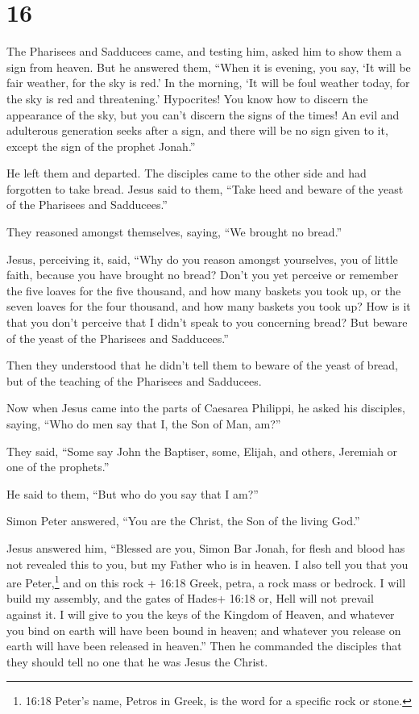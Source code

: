 \hypertarget{section-15}{%
\section{16}\label{section-15}}

 The Pharisees and Sadducees came, and testing him, asked
him to show them a sign from heaven.  But he answered them,
``When it is evening, you say, `It will be fair weather, for the sky is
red.'  In the morning, `It will be foul weather today, for
the sky is red and threatening.' Hypocrites! You know how to discern the
appearance of the sky, but you can't discern the signs of the times!
 An evil and adulterous generation seeks after a sign, and
there will be no sign given to it, except the sign of the prophet
Jonah.''

He left them and departed.  The disciples came to the other
side and had forgotten to take bread.  Jesus said to them,
``Take heed and beware of the yeast of the Pharisees and Sadducees.''

 They reasoned amongst themselves, saying, ``We brought no
bread.''

 Jesus, perceiving it, said, ``Why do you reason amongst
yourselves, you of little faith, because you have brought no bread?
 Don't you yet perceive or remember the five loaves for the
five thousand, and how many baskets you took up,  or the
seven loaves for the four thousand, and how many baskets you took up?
 How is it that you don't perceive that I didn't speak to
you concerning bread? But beware of the yeast of the Pharisees and
Sadducees.''

 Then they understood that he didn't tell them to beware of
the yeast of bread, but of the teaching of the Pharisees and Sadducees.

 Now when Jesus came into the parts of Caesarea Philippi,
he asked his disciples, saying, ``Who do men say that I, the Son of Man,
am?''

 They said, ``Some say John the Baptiser, some, Elijah, and
others, Jeremiah or one of the prophets.''

 He said to them, ``But who do you say that I am?''

 Simon Peter answered, ``You are the Christ, the Son of the
living God.''

 Jesus answered him, ``Blessed are you, Simon Bar Jonah,
for flesh and blood has not revealed this to you, but my Father who is
in heaven.  I also tell you that you are Peter,\footnote{16:18
  Peter's name, Petros in Greek, is the word for a specific rock or
  stone.} and on this rock + 16:18 Greek, petra, a rock mass or bedrock.
I will build my assembly, and the gates of Hades+ 16:18 or, Hell will
not prevail against it.  I will give to you the keys of the
Kingdom of Heaven, and whatever you bind on earth will have been bound
in heaven; and whatever you release on earth will have been released in
heaven.''  Then he commanded the disciples that they should
tell no one that he was Jesus the Christ.

